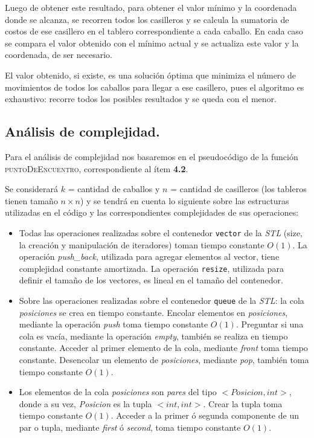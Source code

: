 Luego de obtener este resultado, para obtener el valor mínimo y la
coordenada donde se alcanza, se recorren todos los casilleros y se calcula
la sumatoria de costos de ese casillero en el tablero correspondiente a cada
caballo. En cada caso se compara el valor obtenido con el mínimo actual y se
actualiza este valor y la coordenada, de ser necesario.

El valor obtenido, si existe, es una solución óptima que minimiza el número
de movimientos de todos los caballos para llegar a ese casillero, pues el
algoritmo es exhaustivo: recorre todos los posibles resultados y se queda
con el menor.



\newpage
\subsection{Análisis de complejidad.}

\vspace*{0.3cm}

Para el análisis de complejidad nos basaremos en el pseudocódigo de la función
\textsc{puntoDeEncuentro}, correspondiente al ítem \textbf{4.2}.

Se considerará $k$ = cantidad de caballos y $n$ = cantidad de casilleros (los tableros tienen tamaño $n \times n$) y se tendrá en cuenta lo siguiente sobre las estructuras utilizadas en el código y las correspondientes complejidades de sus operaciones:

\begin{itemize}
  \item Todas las operaciones realizadas sobre el contenedor \verb|vector| de la \textit{STL} (size, la creación y manipulación de iteradores) toman tiempo constante $O(1)$. La operación \textit{push_back}, utilizada para agregar elementos al vector, tiene complejidad constante amortizada. La
  operación \verb|resize|, utilizada para definir el tamaño de los vectores, es lineal en el tamaño del contenedor.

  \item Sobre las operaciones realizadas sobre el contenedor \verb|queue| de la \textit{STL}: la cola \textit{posiciones} se crea en tiempo constante. Encolar elementos en \textit{posiciones}, mediante la operación \textit{push}
  toma tiempo constante $O(1)$. Preguntar si una cola es vacía, mediante la operación \textit{empty}, también se realiza en tiempo constante. Acceder al primer elemento de la cola, mediante \textit{front} toma tiempo constante. Desencolar un elemento de \textit{posiciones}, mediante \textit{pop}, también toma tiempo constante $O(1)$.

  \item Los elementos de la cola \textit{posiciones} son \textit{pares} del
  tipo $<Posicion, int>$, donde a su vez, \textit{Posicion}
  es la tupla $<int, int>$. Crear la tupla toma tiempo constante $O(1)$.
  Acceder a la primer ó segunda componente de un par o tupla, mediante
  \textit{first} ó \textit{second}, toma tiempo constante $O(1)$.

\end{itemize}


